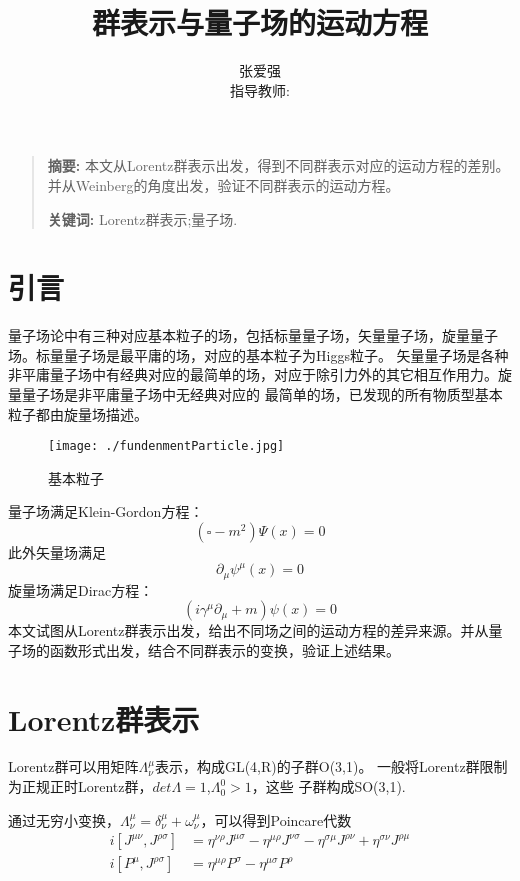 \documentclass[10pt]{ctexart}
\title{群表示与量子场的运动方程}
\author{张爱强\\指导教师: }
\date{}
\newenvironment{sciabstract}{%
\begin{quote} \textbf{摘要: }}
{\end{quote}}
\begin{document}
\maketitle
\begin{sciabstract}
    本文从Lorentz群表示出发，得到不同群表示对应的运动方程的差别。并从Weinberg的角度出发，验证不同群表示的运动方程。
    \par\textbf{关键词: } Lorentz群表示;量子场.
\end{sciabstract}

\section{引言}
量子场论中有三种对应基本粒子的场，包括标量量子场，矢量量子场，旋量量子场。标量量子场是最平庸的场，对应的基本粒子为Higgs粒子。
矢量量子场是各种非平庸量子场中有经典对应的最简单的场，对应于除引力外的其它相互作用力。旋量量子场是非平庸量子场中无经典对应的
最简单的场，已发现的所有物质型基本粒子都由旋量场描述。
\begin{figure}
    \centering
    \texttt{[image: ./fundenmentParticle.jpg]}
    \caption{基本粒子}
    \label{fig:fundenmentParticle}
\end{figure}

量子场满足Klein-Gordon方程\cite{weinberg}：
\begin{equation}
    (\square-m^2)\Psi(x)=0
\end{equation}
此外矢量场满足
\begin{equation}
    \partial_\mu\psi^\mu(x)=0
\end{equation}
旋量场满足Dirac方程：
\begin{equation}
    (i\gamma^\mu\partial_\mu+m)\psi(x)=0
\end{equation}
本文试图从Lorentz群表示出发，给出不同场之间的运动方程的差异来源。并从量子场的函数形式出发，结合不同群表示的变换\cite{weinberg}，验证上述结果。
\section{Lorentz群表示}
Lorentz群可以用矩阵$\Lambda^\mu_\nu$表示，构成GL(4,R)的子群O(3,1)\cite{yucheng}\cite{Zee}。
一般将Lorentz群限制为正规正时Lorentz群，$det\Lambda=1$,$\Lambda^0_0>1$，这些
子群构成SO(3,1).

通过无穷小变换\cite{weinberg}，$\Lambda^\mu_\nu=\delta^\mu_\nu+\omega^\mu_\nu$，可以得到Poincare代数
\begin{align}
    i[J^{\mu\nu},J^{\rho\sigma}]&=\eta^{\nu\rho}J^{\mu\sigma}-\eta^{\mu\rho}J^{\nu\sigma}-\eta^{\sigma\mu}J^{\rho\nu}+\eta^{\sigma\nu}J^{\rho\mu}\\
    i[P^\mu,J^{\rho\sigma}]&=\eta^{\mu\rho}P^{\sigma}-\eta^{\mu\sigma}P^{\rho}
\end{align}
\end{document}
